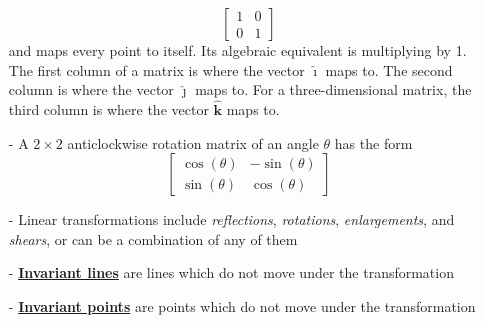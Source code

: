 \documentclass[11pt, a4paper]{article}
\begin{document}
\begin{itemize}
\begin{equation*}
\begin{bmatrix} 1 & 0 \\ 0& 1\end{bmatrix}
\end{equation*}
and maps every point to itself. Its algebraic equivalent is multiplying by 1.
The first column of a matrix is where the vector $\hat{\boldsymbol{\imath}}$ maps to. The second column is where the vector $\hat{\boldsymbol{\jmath}}$ maps to. For a three-dimensional matrix, the third column is where the vector $\hat{\boldsymbol{k}}$ maps to.
\item[-]A $2\times2$ anticlockwise rotation matrix of an angle $\theta$ has the form
\begin{equation*}
\begin{bmatrix} \cos(\theta) & -\sin(\theta) \\ \sin(\theta) & \cos(\theta) \end{bmatrix}
\end{equation*}
\item[-] Linear transformations include \emph{reflections}, \emph{rotations}, \emph{enlargements}, and \emph{shears}, or can be a combination of any of them
\item[-] \textbf{\underline{Invariant lines}} are lines which do not move under the transformation
\item[-] \textbf{\underline{Invariant points}} are points which do not move under the transformation
\end{itemize} \par
\vspace{0.5cm}
\end{document}
